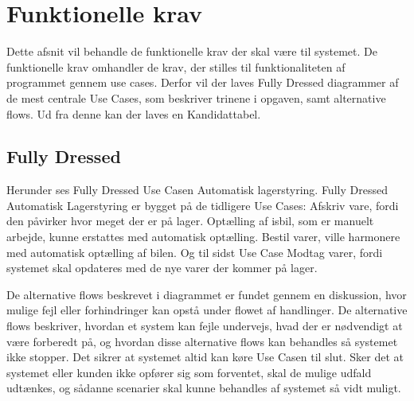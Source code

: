 \section{Funktionelle krav}\label{sec:funktionelle-krav}
Dette afsnit vil behandle de funktionelle krav der skal være til systemet. De funktionelle krav omhandler de krav, der stilles til funktionaliteten af programmet gennem use cases\cite{Larman2004}. Derfor vil der laves Fully Dressed\cite{Larman2004} diagrammer af de mest centrale Use Cases, som beskriver trinene i opgaven, samt alternative flows. Ud fra denne kan der laves en Kandidattabel\cite{Larman2004}.

\subsection{Fully Dressed} \label{fullydressed}
Herunder ses Fully Dressed Use Casen Automatisk lagerstyring. Fully Dressed Automatisk Lagerstyring er bygget på de tidligere Use Cases: Afskriv vare, fordi den påvirker hvor meget der er på lager. Optælling af isbil, som er manuelt arbejde, kunne erstattes med automatisk optælling. Bestil varer, ville harmonere med automatisk optælling af bilen. Og til sidst Use Case Modtag varer, fordi systemet skal opdateres med de nye varer der kommer på lager. 

De alternative flows beskrevet i diagrammet er fundet gennem en diskussion, hvor mulige fejl eller forhindringer kan opstå under flowet af handlinger. De alternative flows beskriver, hvordan et system kan fejle undervejs, hvad der er nødvendigt at være forberedt på, og hvordan disse alternative flows kan behandles så systemet ikke stopper. Det sikrer at systemet altid kan køre Use Casen til slut. Sker det at systemet eller kunden ikke opfører sig som forventet, skal de mulige udfald udtænkes, og sådanne scenarier skal kunne behandles af systemet så vidt muligt.

